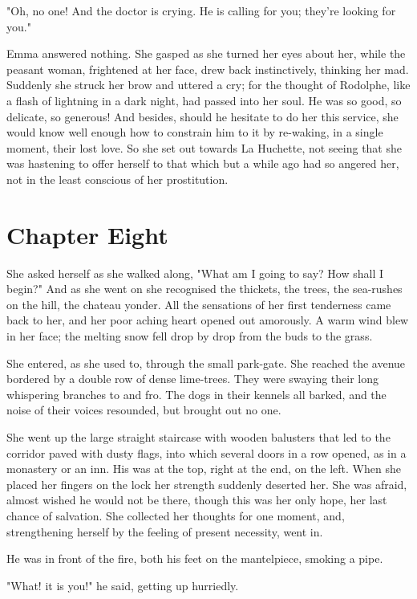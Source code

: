 \documentclass{tufte-book}
\begin{document}
"Oh, no one! And the doctor is crying. He is calling for you; they're
looking for you."

Emma answered nothing. She gasped as she turned her eyes about
her, while the peasant woman, frightened at her face, drew back
instinctively, thinking her mad. Suddenly she struck her brow and
uttered a cry; for the thought of Rodolphe, like a flash of lightning in
a dark night, had passed into her soul. He was so good, so delicate, so
generous! And besides, should he hesitate to do her this service, she
would know well enough how to constrain him to it by re-waking, in a
single moment, their lost love. So she set out towards La Huchette, not
seeing that she was hastening to offer herself to that which but a while
ago had so angered her, not in the least conscious of her prostitution.



\chapter{Chapter Eight}

She asked herself as she walked along, "What am I going to say? How
shall I begin?" And as she went on she recognised the thickets,
the trees, the sea-rushes on the hill, the chateau yonder. All the
sensations of her first tenderness came back to her, and her poor aching
heart opened out amorously. A warm wind blew in her face; the melting
snow fell drop by drop from the buds to the grass.

She entered, as she used to, through the small park-gate. She reached
the avenue bordered by a double row of dense lime-trees. They were
swaying their long whispering branches to and fro. The dogs in their
kennels all barked, and the noise of their voices resounded, but brought
out no one.

She went up the large straight staircase with wooden balusters that led
to the corridor paved with dusty flags, into which several doors in a
row opened, as in a monastery or an inn. His was at the top, right
at the end, on the left. When she placed her fingers on the lock her
strength suddenly deserted her. She was afraid, almost wished he
would not be there, though this was her only hope, her last chance of
salvation. She collected her thoughts for one moment, and, strengthening
herself by the feeling of present necessity, went in.

He was in front of the fire, both his feet on the mantelpiece, smoking a
pipe.

"What! it is you!" he said, getting up hurriedly.
\end{document}
